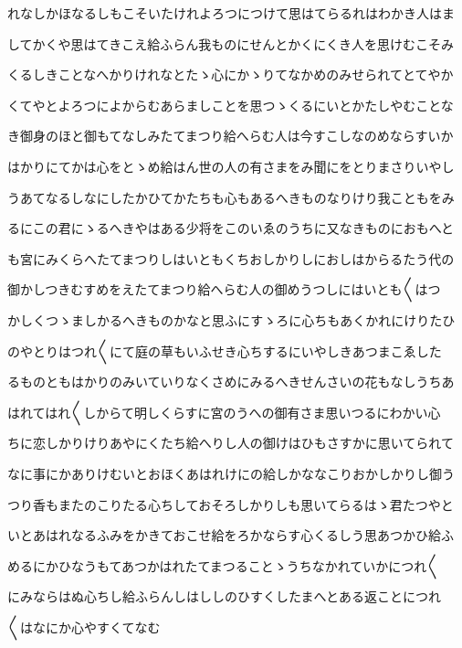 \documentclass[a4paper,11pt,landscape]{ltjtarticle}
\begin{document}
\par\medskip
れなしかほなるしもこそいたけれよろつにつけて思はてらるれはわかき人はま
\par\medskip
してかくや思はてきこえ給ふらん我ものにせんとかくにくき人を思けむこそみ
\par\medskip
くるしきことなへかりけれなとたゝ心にかゝりてなかめのみせられてとてやか
\par\medskip
くてやとよろつによからむあらましことを思つゝくるにいとかたしやむことな
\par\medskip
き御身のほと御もてなしみたてまつり給へらむ人は今すこしなのめならすいか
\par\medskip
はかりにてかは心をとゝめ給はん世の人の有さまをみ聞にをとりまさりいやし
\par\medskip
うあてなるしなにしたかひてかたちも心もあるへきものなりけり我こともをみ
\par\medskip
るにこの君にゝるへきやはある少将をこのいゑのうちに又なきものにおもへと
\par\medskip
も宮にみくらへたてまつりしはいともくちおしかりしにおしはからるたう代の
\par\medskip
御かしつきむすめをえたてまつり給へらむ人の御めうつしにはいとも〱はつ
\par\medskip
かしくつゝましかるへきものかなと思ふにすゝろに心ちもあくかれにけりたひ
\par\medskip
のやとりはつれ〱にて庭の草もいふせき心ちするにいやしきあつまこゑした
\par\medskip
るものともはかりのみいていりなくさめにみるへきせんさいの花もなしうちあ
\par\medskip
はれてはれ〱しからて明しくらすに宮のうへの御有さま思いつるにわかい心
\par\medskip
ちに恋しかりけりあやにくたち給へりし人の御けはひもさすかに思いてられて
\par\medskip
なに事にかありけむいとおほくあはれけにの給しかななこりおかしかりし御う
\par\medskip
つり香もまたのこりたる心ちしておそろしかりしも思いてらるはゝ君たつやと
\par\medskip
いとあはれなるふみをかきておこせ給をろかならす心くるしう思あつかひ給ふ
\par\medskip
めるにかひなうもてあつかはれたてまつることゝうちなかれていかにつれ〱
\par\medskip
にみならはぬ心ちし給ふらんしはししのひすくしたまへとある返ことにつれ
\par\medskip
〱はなにか心やすくてなむ
\par\medskip
\end{document}
